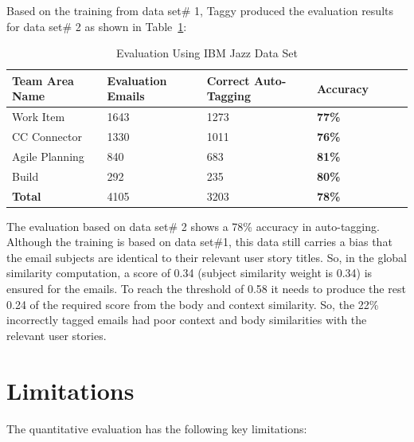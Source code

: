 Based on the training from data set\# 1, Taggy produced the evaluation results for data set\# 2 as shown in Table~\ref{tab:jazz_evaluation}:

\begin{table}[h!]
  \centering
  \caption{Evaluation Using IBM Jazz Data Set}
	\label{tab:jazz_evaluation}
    \begin{tabular}{|p{4cm}|p{3cm}|p{3cm}|p{2cm}|p{2cm}|p{2cm}|p{2cm}|}
      \hline
      \textbf{Team Area Name} & \textbf{Evaluation Emails} & \textbf{Correct Auto-Tagging} & \textbf{Accuracy}\\
      \hline
      Work Item 				& 1643 	 	&	1273 & \textbf{77\%}\\
      \hline
      CC Connector 			& 1330 			&	1011	& \textbf{76\%}\\
      \hline
      Agile Planning 		& 840 		 	& 683		& \textbf{81\%}\\
   		\hline
      Build 						& 292 			&	235		& \textbf{80\%}\\
      \hline
      \textbf{Total} 		& 4105 				& 3203 	& \textbf{78\%}\\
      \hline
    \end{tabular}
\end{table}

The evaluation based on data set\# 2 shows a 78\% accuracy in auto-tagging. Although the training is based on data set\#1, this data still carries a bias that the email subjects are identical to their relevant user story titles. So, in the global similarity computation, a score of 0.34 (subject similarity weight is 0.34) is ensured for the emails. To reach the threshold of 0.58 it needs to produce the rest 0.24 of the required score from the body and context similarity. So, the 22\% incorrectly tagged emails had poor context and body similarities with the relevant user stories.

\section{Limitations}
The quantitative evaluation has the following key limitations:

